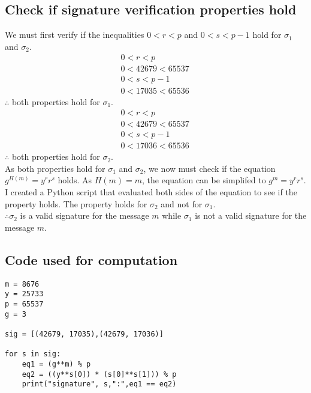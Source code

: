\documentclass[12pt, letterpaper]{article}
\begin{document}
\begin{itemize}
\subsection{Check if signature verification properties hold}
We must first verify if the inequalities $0<r<p$ and $0<s<p-1$ hold for $\sigma_1$ and $\sigma_2$.
\begin{align*}
&0<r<p \quad \\ 
&0<42679<65537 \quad
\end{align*}
\begin{align*}
&0<s<p-1 \quad \\ 
&0<17035<65536 \quad
\end{align*}
$\therefore$ both properties hold for $\sigma_1$.
\begin{align*}
&0<r<p \quad \\ 
&0<42679<65537 \quad
\end{align*}
\begin{align*}
&0<s<p-1 \quad \\ 
&0<17036<65536 \quad
\end{align*}
$\therefore$ both properties hold for $\sigma_2$.\newline \\
As both properties hold for $\sigma_1$ and $\sigma_2$, we now must check if the equation $g^{H(m)}=y^{r}r^{s}$ holds. As $H(m)= m$, the equation can be simplifed to $g^{m}=y^{r}r^{s}$. I created a Python script that evaluated both sides of the equation to see if the property holds.
The property holds for $\sigma_2$ and not for $\sigma_1$.\newline \\ $\therefore \sigma_2$ is a valid signature for the message $m$ while $\sigma_1$ is not a valid signature for the message $m$.

\subsection{Code used for computation}
\begin{lstlisting}
m = 8676
y = 25733
p = 65537
g = 3

sig = [(42679, 17035),(42679, 17036)]

for s in sig:
    eq1 = (g**m) % p
    eq2 = ((y**s[0]) * (s[0]**s[1])) % p
    print("signature", s,":",eq1 == eq2)
\end{lstlisting}

\end{itemize}

\newpage
\end{document}
